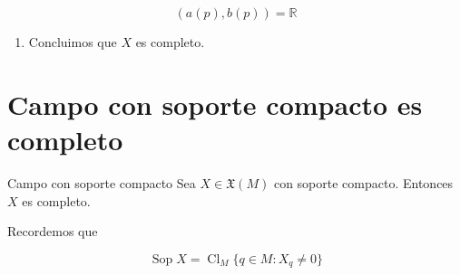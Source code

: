 \begin{bookproof}{}
\[
(a(p),b(p))=\mathbb R
\]
\begin{enumerate}[start=19]
\item Concluimos que $X$ es completo.
\end{enumerate}
\bookqed
\end{bookproof}
\label{blk:17fba4}
\section{Campo con soporte compacto es completo}
\begin{booktheorem}{Campo con soporte compacto}
Sea $X\in\mathfrak X(M)$ con soporte compacto. Entonces $X$ es completo.

Recordemos que

\[
\operatorname{Sop}X=\operatorname{Cl}_M\{q\in M:X_q\neq0\}
\]
\end{booktheorem}
